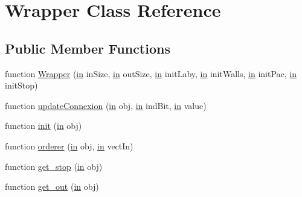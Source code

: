 \hypertarget{class_wrapper}{}\section{Wrapper Class Reference}
\label{class_wrapper}
\subsection*{Public Member Functions}
\begin{DoxyCompactItemize}
\item 
function \hyperlink{class_wrapper_ab0ebf6c7738beb446d13d2d9445fbc8a}{Wrapper} (\hyperlink{class_wrapper_a5e252d97ca5bf85c5753e2914673eead}{in} in\+Size, \hyperlink{class_wrapper_a5e252d97ca5bf85c5753e2914673eead}{in} out\+Size, \hyperlink{class_wrapper_a5e252d97ca5bf85c5753e2914673eead}{in} init\+Laby, \hyperlink{class_wrapper_a5e252d97ca5bf85c5753e2914673eead}{in} init\+Walls, \hyperlink{class_wrapper_a5e252d97ca5bf85c5753e2914673eead}{in} init\+Pac, \hyperlink{class_wrapper_a5e252d97ca5bf85c5753e2914673eead}{in} init\+Stop)
\item 
function \hyperlink{class_wrapper_aa41b9b215897635f48e1c8a4eaca7640}{update\+Connexion} (\hyperlink{class_wrapper_a5e252d97ca5bf85c5753e2914673eead}{in} obj, \hyperlink{class_wrapper_a5e252d97ca5bf85c5753e2914673eead}{in} ind\+Bit, \hyperlink{class_wrapper_a5e252d97ca5bf85c5753e2914673eead}{in} value)
\item 
function \hyperlink{class_wrapper_a7d486dd79e7c7bc857ffaa4e273d27c5}{init} (\hyperlink{class_wrapper_a5e252d97ca5bf85c5753e2914673eead}{in} obj)
\item 
function \hyperlink{class_wrapper_a9c889c73b9d4b80dde64dfe385ed747e}{orderer} (\hyperlink{class_wrapper_a5e252d97ca5bf85c5753e2914673eead}{in} obj, \hyperlink{class_wrapper_a5e252d97ca5bf85c5753e2914673eead}{in} vect\+In)
\item 
function \hyperlink{class_wrapper_aaba4a98b8b3bf391348722f0f227e333}{get\+\_\+stop} (\hyperlink{class_wrapper_a5e252d97ca5bf85c5753e2914673eead}{in} obj)
\item 
function \hyperlink{class_wrapper_a15af7c208437e3c98d1f130b45a36a37}{get\+\_\+out} (\hyperlink{class_wrapper_a5e252d97ca5bf85c5753e2914673eead}{in} obj)
\end{DoxyCompactItemize}
